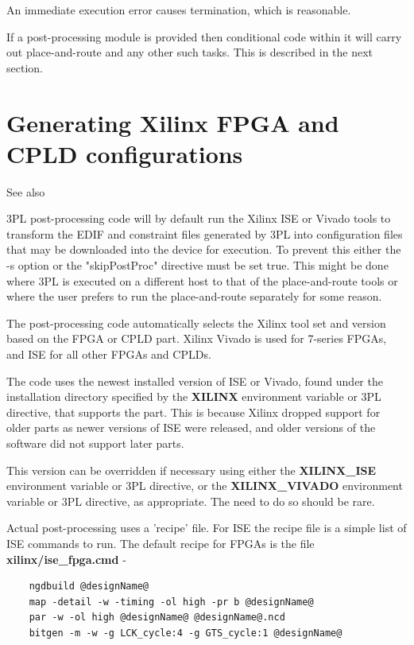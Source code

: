         An immediate execution error causes termination, which is reasonable.
        
        If a post-processing module is provided then conditional code within
        it will carry out place-and-route and any other such tasks. This is
        described in the next section.
        

    \section{Generating Xilinx FPGA and CPLD configurations}\label{sec:xpp}
    
        See also 

    	3PL post-processing code will by default run the Xilinx ISE or Vivado
	tools to transform the EDIF and constraint files generated by 3PL into
	configuration files that may be downloaded into the device for execution.
	To prevent this either the -s option or the "skipPostProc" directive must
        be set true. This might be done where 3PL is executed on a different
        host to that of the place-and-route tools or where the user prefers
        to run the place-and-route separately for some reason.

	The post-processing code automatically selects the Xilinx tool set and
	version based on the FPGA or CPLD part. Xilinx Vivado is used for 7-series
	FPGAs, and ISE for all other FPGAs and CPLDs.

	The code uses the newest installed version of ISE or Vivado, found under
	the installation directory specified by the {\bf XILINX} environment
	variable or 3PL directive, that supports the part.
	This is because Xilinx dropped support for older parts as newer
	versions of ISE were released, and older versions of the software did
	not support later parts.

	This version can be overridden if necessary using either the
	{\bf XILINX\_ISE} environment variable or 3PL directive, or the
	{\bf XILINX\_VIVADO} environment variable or 3PL directive, as
	appropriate. The need to do so should be rare.

	Actual post-processing uses a 'recipe' file. For ISE the recipe file is
	a simple list of ISE commands to run. The default recipe for FPGAs is 
	the file {\bf xilinx/ise\_fpga.cmd} -

        \begin{verbatim}
	ngdbuild @designName@
	map -detail -w -timing -ol high -pr b @designName@
	par -w -ol high @designName@ @designName@.ncd
	bitgen -m -w -g LCK_cycle:4 -g GTS_cycle:1 @designName@
        \end{verbatim}

